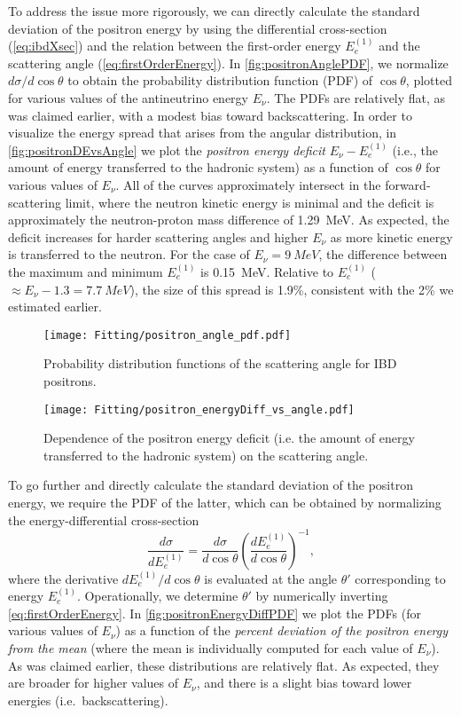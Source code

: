 \documentclass[../thesis.tex]{subfiles}
\begin{document}
To address the issue more rigorously, we can directly calculate the standard deviation of the positron energy by using the differential cross-section (\autoref{eq:ibdXsec}) and the relation between the first-order energy $E_e^{(1)}$ and the scattering angle (\autoref{eq:firstOrderEnergy}). In \autoref{fig:positronAnglePDF}, we normalize $d\sigma/d\cos\theta$ to obtain the probability distribution function (PDF) of $\cos\theta$, plotted for various values of the antineutrino energy $E_\nu$. The PDFs are relatively flat, as was claimed earlier, with a modest bias toward backscattering. In order to visualize the energy spread that arises from the angular distribution, in \autoref{fig:positronDEvsAngle} we plot the \emph{positron energy deficit} $E_\nu - E_e^{(1)}$ (i.e., the amount of energy transferred to the hadronic system) as a function of $\cos\theta$ for various values of $E_\nu$. All of the curves approximately intersect in the forward-scattering limit, where the neutron kinetic energy is minimal and the deficit is approximately the neutron-proton mass difference of 1.29~MeV. As expected, the deficit increases for harder scattering angles and higher $E_\nu$ as more kinetic energy is transferred to the neutron. For the case of $E_\nu = \SI{9}{MeV}$, the difference between the maximum and minimum $E_e^{(1)}$ is 0.15~MeV. Relative to $E_e^{(1)}$ ($\approx E_\nu - 1.3 = \SI{7.7}{MeV}$), the size of this spread is 1.9\%, consistent with the 2\% we estimated earlier.

\begin{figure}[ht]
  \texttt{[image: Fitting/positron\_angle\_pdf.pdf]}
  \caption{Probability distribution functions of the scattering angle for IBD positrons.}
  \label{fig:positronAnglePDF}
\end{figure}

\begin{figure}[ht]
  \texttt{[image: Fitting/positron\_energyDiff\_vs\_angle.pdf]}
  \caption{Dependence of the positron energy deficit (i.e. the amount of energy transferred to the hadronic system) on the scattering angle.}
  \label{fig:positronDEvsAngle}
\end{figure}

To go further and directly calculate the standard deviation of the positron energy, we require the PDF of the latter, which can be obtained by normalizing the energy-differential cross-section
\begin{equation}
  \frac{d\sigma}{dE_e^{(1)}} = \frac{d\sigma}{d\cos\theta} \left( \frac{dE_e^{(1)}}{d\cos\theta} \right)^{-1},
\end{equation}
where the derivative $dE_e^{(1)}/d\cos\theta$ is evaluated at the angle $\theta'$ corresponding to energy $E_e^{(1)}$. Operationally, we determine $\theta'$ by numerically inverting \autoref{eq:firstOrderEnergy}. In \autoref{fig:positronEnergyDiffPDF} we plot the PDFs (for various values of $E_\nu$) as a function of the \emph{percent deviation of the positron energy from the mean} (where the mean is individually computed for each value of $E_\nu$). As was claimed earlier, these distributions are relatively flat. As expected, they are broader for higher values of $E_\nu$, and there is a slight bias toward lower energies (i.e.\  backscattering).
\end{document}
